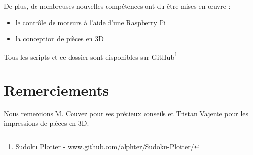 \documentclass[12pt,a4paper]{report}
\begin{document}
De plus, de nombreuses nouvelles compétences ont du être mises en œuvre :

\begin{itemize}[label=--]
\item le contrôle de moteurs à l'aide d'une Raspberry Pi
\item la conception de pièces en 3D

\end{itemize}
Tous les scripts et ce dossier sont disponibles sur GitHub\footnote{Sudoku Plotter - \url{www.github.com/alphter/Sudoku-Plotter/}}

\chapter*{Remerciements}

Nous remercions M. Couvez pour ses précieux conseils et Tristan Vajente pour les impressions de pièces en 3D.

%
\end{document}
